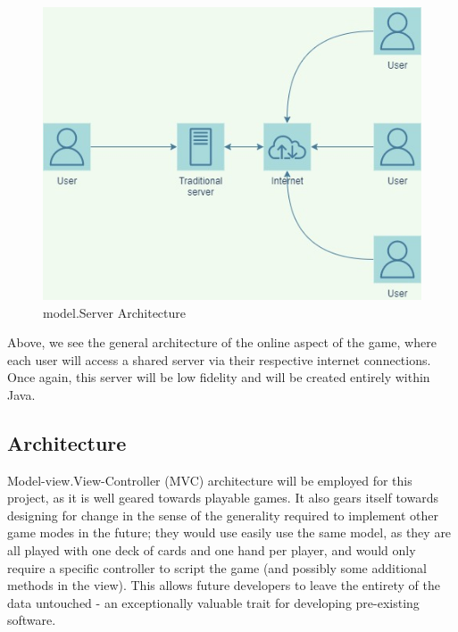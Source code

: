 \documentclass[12pt, titlepage]{article}
\begin{document}
    \begin{figure}
        \includegraphics[width=14cm]{implementation_environment (1).jpg}
        \caption{model.Server Architecture}
    \end{figure}

\bigskip

Above, we see the general architecture of the online aspect of the game, where each user will access a shared server via their respective internet connections. Once again, this server will be low fidelity and will be created entirely within Java. 

\subsection{Architecture}

Model-view.View-Controller (MVC) architecture will be employed for this project, as it is well geared towards playable games. It also gears itself towards designing for change in the sense of the generality required to implement other game modes in the future; they would use easily use the same model, as they are all played with one deck of cards and one hand per player, and would only require a specific controller to script the game (and possibly some additional methods in the view). This allows future developers to leave the entirety of the data untouched - an exceptionally valuable trait for developing pre-existing software.
\end{document}
